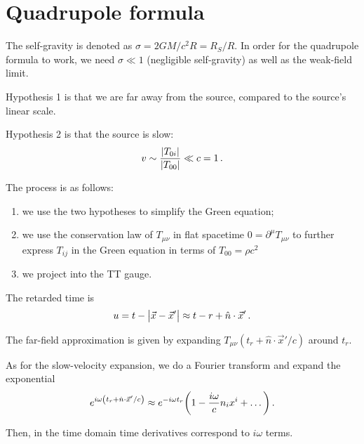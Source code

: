 \documentclass[main.tex]{subfiles}
\begin{document}
\section{Quadrupole formula}


The self-gravity is denoted as \(\sigma = 2 GM / c^2 R = R_S / R\). 
In order for the quadrupole formula to work, we need \(\sigma \ll 1\) (negligible self-gravity) as well as the weak-field limit.  

Hypothesis 1 is that we are far away from the source, compared to the source's linear scale.

Hypothesis 2 is that the source is slow: 
%
\begin{align}
v \sim \frac{\abs{T_{0i}}}{\abs{T_{00} }} \ll c = 1
\,.
\end{align}

The process is as follows:
\begin{enumerate}
    \item we use the two hypotheses to simplify the Green equation;
    \item we use the conservation law of \(T_{\mu \nu }\) in flat spacetime \(0 = \partial^{\mu } T_{\mu \nu }\) to further express \(T_{ij} \) in the Green equation in terms of \(T_{00} = \rho c^2\)
    \item we project into the TT gauge.
\end{enumerate}

The retarded time is 
%
\begin{align}
u = t - \abs{\vec{x} - \vec{x}'} \approx t- r + \hat{n}\cdot \vec{x}' 
\,.
\end{align}

The far-field approximation is given by expanding \(T_{\mu \nu } (t_r + \hat{n} \cdot \vec{x}' / c)\) around \(t_r\).

As for the slow-velocity expansion, we do a Fourier transform and expand the exponential 
%
\begin{align}
e^{i \omega \qty(t_r + \hat{n} \cdot \vec{x}' /c)} \approx e^{-i \omega t_r} \qty(1 - \frac{i \omega }{c} n_i x^{i} + \dots)
\,.
\end{align}

Then, in the time domain time derivatives correspond to \(i \omega \) terms. 
\end{document}
